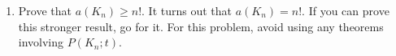 \documentclass[11pt]{article}%
\theoremstyle{definition}
\begin{document}
\begin{enumerate}
\item Prove that $a(K_n)\geq n!$.  It turns out that $a(K_n)=n!$.  If you can prove this stronger result, go for it. For this problem, avoid using any theorems involving $P(K_n;t)$.

\end{enumerate}
\end{document}
